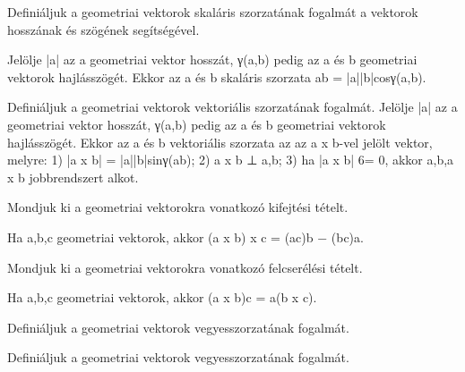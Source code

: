\begin{frame}
  \begin{tcolorbox}[title={18}]
   Deﬁniáljuk a geometriai vektorok skaláris szorzatának fogalmát a vektorok hosszának és szögének segítségével.

  \tcblower
Jelölje |a| az a geometriai vektor hosszát, γ(a,b) pedig az a és b geometriai vektorok hajlásszögét. Ekkor az a és b skaláris szorzata ab = |a||b|cosγ(a,b).

  \end{tcolorbox}
\end{frame}


\begin{frame}
  \begin{tcolorbox}[title={19}]
   Deﬁniáljuk a geometriai vektorok vektoriális szorzatának fogalmát.
  \tcblower
Jelölje |a| az a geometriai vektor hosszát, γ(a,b) pedig az a és b geometriai vektorok hajlásszögét. Ekkor az a és b vektoriális szorzata az az a x b-vel jelölt vektor, melyre: 1) |a x b| = |a||b|sinγ(ab); 2) a x b ⊥ a,b; 3) ha |a x b| 6= 0, akkor a,b,a x b jobbrendszert alkot.

  \end{tcolorbox}
\end{frame}


\begin{frame}
  \begin{tcolorbox}[title={20}]
    Mondjuk ki a geometriai vektorokra vonatkozó kifejtési tételt.

  \tcblower
Ha a,b,c geometriai vektorok, akkor (a x b) x c = (ac)b − (bc)a.

  \end{tcolorbox}
\end{frame}


\begin{frame}
  \begin{tcolorbox}[title={21}]
    Mondjuk ki a geometriai vektorokra vonatkozó felcserélési tételt.

  \tcblower
    Ha a,b,c geometriai vektorok, akkor (a x b)c = a(b x c). 
  \end{tcolorbox}
\end{frame}


\begin{frame}
  \begin{tcolorbox}[title={22}]
    Deﬁniáljuk a geometriai vektorok vegyesszorzatának fogalmát.

  \tcblower
 Deﬁniáljuk a geometriai vektorok vegyesszorzatának fogalmát.

  \end{tcolorbox}
\end{frame}


